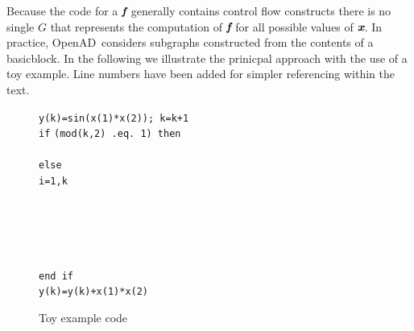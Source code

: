 \documentclass[acmtocl,acmnow]{acmtrans2m}
\newcommand{\basicblock}{basicblock}
\newcommand{\OpenAD}{OpenAD}
\newcommand{\bmf}{\mbox{\bf\em f}}
\newcommand{\bmx}{\mbox{\bf\em x}}
\begin{document}
Because the code for a $\bmf$ generally contains control flow constructs there is no 
single $G$ that represents the computation of $\bmf$ for all possible values of $\bmx$.
In practice, \OpenAD\ considers subgraphs constructed 
from the contents of a \basicblock.
In the following we illustrate the prinicpal approach with the use 
of a toy example.  
Line numbers have been added for simpler referencing within the text.
\begin{figure}
\begin{tabbing}
\hspace{.6cm}{\footnotesize \bf 01}\hspace{.5cm} {\tt y(k)=sin(x(1)*x(2)); k=k+1} \\
\hspace{.6cm}{\footnotesize \bf 02}\hspace{.5cm} {\tt if} \={\tt (mod(k,2) .eq. 1) then } \\
\hspace{.6cm}{\footnotesize \bf 03}\hspace{.5cm}   \\
\hspace{.6cm}{\footnotesize \bf 04}\hspace{.5cm} {\tt else } \\
\hspace{.6cm}{\footnotesize \bf 05}\hspace{.5cm}  \={\tt i=1,k } \\
\hspace{.6cm}{\footnotesize \bf 06}\hspace{.5cm} \> \\
\hspace{.6cm}{\footnotesize \bf 07}\hspace{.5cm} \> \\
\hspace{.6cm}{\footnotesize \bf 08}\hspace{.5cm} \> \\
\hspace{.6cm}{\footnotesize \bf 09}\hspace{.5cm} \> \\
\hspace{.6cm}{\footnotesize \bf 10}\hspace{.5cm}  \\
\hspace{.6cm}{\footnotesize \bf 11}\hspace{.5cm} {\tt end if } \\
\hspace{.6cm}{\footnotesize \bf 12}\hspace{.5cm} {\tt y(k)=y(k)+x(1)*x(2) } 
\end{tabbing}
\caption{Toy example code}\label{fig:toy}
\end{figure}
\end{document}
